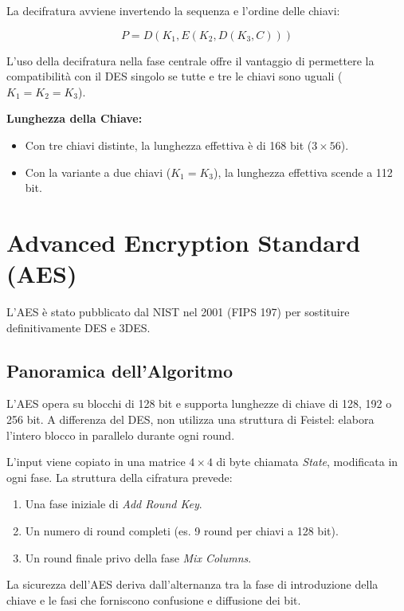 La decifratura avviene invertendo la sequenza e l'ordine delle chiavi:

$$P = D(K_1, E(K_2, D(K_3, C)))$$

L'uso della decifratura nella fase centrale offre il vantaggio di permettere la compatibilità con il DES singolo se tutte e tre le chiavi sono uguali ($K_1 = K_2 = K_3$). 

\textbf{Lunghezza della Chiave:}
\begin{itemize}
    \item Con tre chiavi distinte, la lunghezza effettiva è di 168 bit ($3 \times 56$).
    \item Con la variante a due chiavi ($K_1 = K_3$), la lunghezza effettiva scende a 112 bit.
\end{itemize}

\section{Advanced Encryption Standard (AES)}

L'AES è stato pubblicato dal NIST nel 2001 (FIPS 197) per sostituire definitivamente DES e 3DES.

\subsection{Panoramica dell'Algoritmo}
L'AES opera su blocchi di 128 bit e supporta lunghezze di chiave di 128, 192 o 256 bit. A differenza del DES, non utilizza una struttura di Feistel: elabora l'intero blocco in parallelo durante ogni round.

L'input viene copiato in una matrice $4 \times 4$ di byte chiamata \textit{State}, modificata in ogni fase. La struttura della cifratura prevede:
\begin{enumerate}
    \item Una fase iniziale di \textit{Add Round Key}.
    \item Un numero di round completi (es. 9 round per chiavi a 128 bit).
    \item Un round finale privo della fase \textit{Mix Columns}.
\end{enumerate}

La sicurezza dell'AES deriva dall'alternanza tra la fase di introduzione della chiave e le fasi che forniscono confusione e diffusione dei bit.

